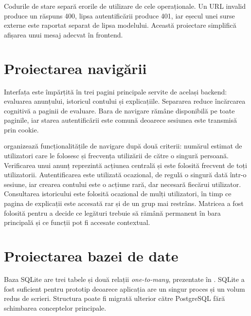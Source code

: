 Codurile de stare separă erorile de utilizare de cele operaționale. Un URL invalid produce un răspuns 400, lipsa autentificării produce 401, iar eșecul unei surse externe este raportat separat de lipsa modelului. Această proiectare simplifică afișarea unui mesaj adecvat în frontend.

\section{Proiectarea navigării}
\label{sec:app-navigation}

Interfața este împărțită în trei pagini principale servite de același backend: evaluarea anunțului, istoricul contului și explicațiile. Separarea reduce încărcarea cognitivă a paginii de evaluare. Bara de navigare rămâne disponibilă pe toate paginile, iar starea autentificării este comună deoarece sesiunea este transmisă prin cookie.

 organizează funcționalitățile de navigare după două criterii: numărul estimat de utilizatori care le folosesc și frecvența utilizării de către o singură persoană. Verificarea unui anunț reprezintă acțiunea centrală și este folosită frecvent de toți utilizatorii. Autentificarea este utilizată ocazional, de regulă o singură dată într-o sesiune, iar crearea contului este o acțiune rară, dar necesară fiecărui utilizator. Consultarea istoricului este folosită ocazional de mulți utilizatori, în timp ce pagina de explicații este accesată rar și de un grup mai restrâns. Matricea a fost folosită pentru a decide ce legături trebuie să rămână permanent în bara principală și ce funcții pot fi accesate contextual.


\section{Proiectarea bazei de date}
\label{sec:app-database}

Baza SQLite are trei tabele și două relații \emph{one-to-many}, prezentate în . SQLite a fost suficient pentru prototip deoarece aplicația are un singur proces și un volum redus de scrieri. Structura poate fi migrată ulterior către PostgreSQL fără schimbarea conceptelor principale.


